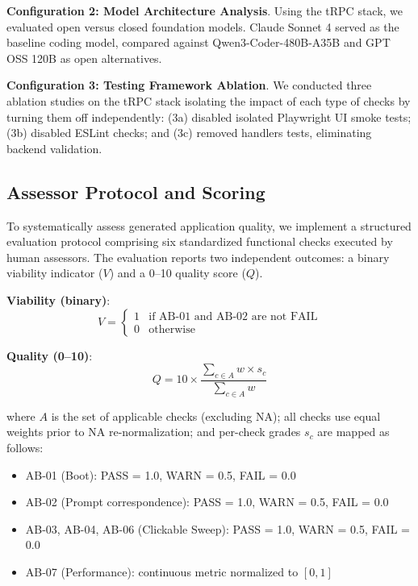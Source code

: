 \documentclass{article}
\begin{document}
\textbf{Configuration 2: Model Architecture Analysis}. Using the tRPC stack, we evaluated open versus closed foundation models. Claude Sonnet 4 served as the baseline coding model, compared against Qwen3-Coder-480B-A35B \citep{qwen2025qwen3} and GPT OSS 120B \citep{openai2025gpt} as open alternatives.

\textbf{Configuration 3: Testing Framework Ablation}. We conducted three ablation studies on the tRPC stack isolating the impact of each type of checks by turning them off independently: (3a) disabled isolated Playwright UI smoke tests; (3b) disabled ESLint checks; and (3c) removed handlers tests, eliminating backend validation.

\subsection{Assessor Protocol and Scoring}
\label{sec:scoring}

To systematically assess generated application quality, we implement a structured evaluation protocol comprising six standardized functional checks executed by human assessors. The evaluation reports two independent outcomes: a binary viability indicator ($V$) and a 0--10 quality score ($Q$).

\textbf{Viability (binary)}:
\begin{equation}
V = \begin{cases}
1 & \text{if AB-01 and AB-02 are not FAIL} \\
0 & \text{otherwise}
\end{cases}
\end{equation}

\textbf{Quality (0--10)}:
\begin{equation}
Q = 10 \times \frac{\sum_{c \in A} w \times s_c}{\sum_{c \in A} w}
\end{equation}

where $A$ is the set of applicable checks (excluding NA); all checks use equal weights prior to NA re-normalization; and per-check grades $s_c$ are mapped as follows:
\begin{itemize}
\item AB-01 (Boot): PASS = 1.0, WARN = 0.5, FAIL = 0.0
\item AB-02 (Prompt correspondence): PASS = 1.0, WARN = 0.5, FAIL = 0.0
\item AB-03, AB-04, AB-06 (Clickable Sweep): PASS = 1.0, WARN = 0.5, FAIL = 0.0
\item AB-07 (Performance): continuous metric normalized to $[0,1]$
\end{itemize}
\end{document}
